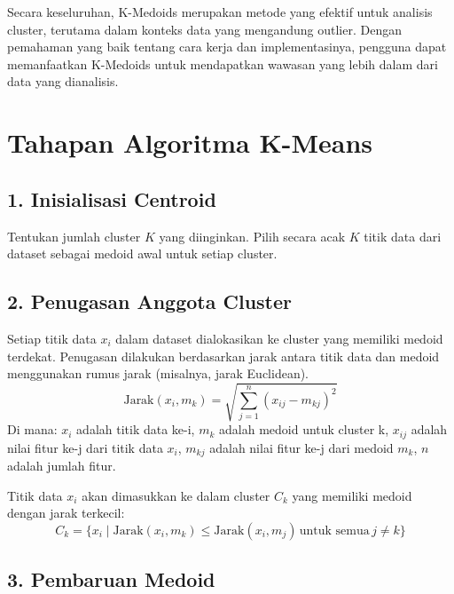 \documentclass[
  oneside]{book}
\begin{document}
Secara keseluruhan, K-Medoids merupakan metode yang efektif untuk analisis cluster, terutama dalam konteks data yang mengandung outlier. Dengan pemahaman yang baik tentang cara kerja dan implementasinya, pengguna dapat memanfaatkan K-Medoids untuk mendapatkan wawasan yang lebih dalam dari data yang dianalisis.

\section{Tahapan Algoritma K-Means}\label{tahapan-algoritma-k-means-1}

\subsection*{1. Inisialisasi Centroid}\label{inisialisasi-centroid-1}

Tentukan jumlah cluster \(K\) yang diinginkan. Pilih secara acak \(K\) titik data dari dataset sebagai medoid awal untuk setiap cluster.

\subsection*{2. Penugasan Anggota Cluster}\label{penugasan-anggota-cluster}

Setiap titik data \(x_i\) dalam dataset dialokasikan ke cluster yang memiliki medoid terdekat. Penugasan dilakukan berdasarkan jarak antara titik data dan medoid menggunakan rumus jarak (misalnya, jarak Euclidean).
\[
   \text{Jarak}(x_i, m_k) = \sqrt{\sum_{j=1}^n (x_{ij} - m_{kj})^2}
   \]
Di mana:
\(x_i\) adalah titik data ke-i, \(m_k\) adalah medoid untuk cluster k, \(x_{ij}\) adalah nilai fitur ke-j dari titik data \(x_i\), \(m_{kj}\) adalah nilai fitur ke-j dari medoid \(m_k\), \(n\) adalah jumlah fitur.

Titik data \(x_i\) akan dimasukkan ke dalam cluster \(C_k\) yang memiliki medoid dengan jarak terkecil:
\[
   C_k = \{ x_i \mid \text{Jarak}(x_i, m_k) \leq \text{Jarak}(x_i, m_j) \, \text{untuk semua} \, j \neq k \}
   \]

\subsection*{3. Pembaruan Medoid}\label{pembaruan-medoid}
\end{document}
